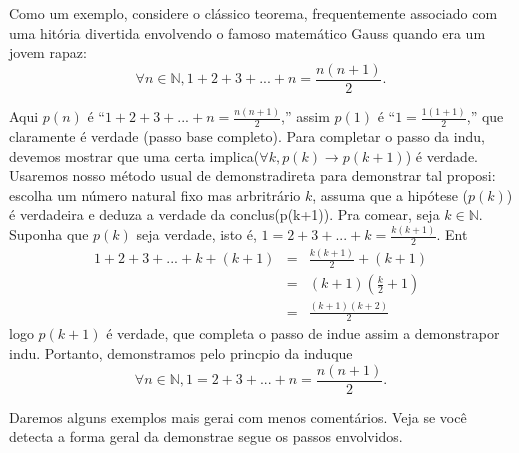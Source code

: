 Como um exemplo, considere o cl\'assico teorema, frequentemente associado com uma hit\'oria divertida envolvendo o famoso matem\'atico Gauss quando era um jovem rapaz:
\[
\forall n\in\mathbb{N}, 1+2+3+...+n=\frac{n(n+1)}{2}.
\]

Aqui $p(n)$ \'e ``$1+2+3+...+n=\frac{n(n+1)}{2}$,'' assim $p(1)$ \'e ``$1=\frac{1(1+1)}{2}$,'' que claramente \'e verdade (passo base completo). Para completar o passo da indu\caoi, devemos mostrar que uma certa implica\cao ($\forall k, p(k)\rightarrow p(k+1)$) \'e verdade. Usaremos nosso m\'etodo usual de demonstra\cao direta para demonstrar tal proposi\caoi: escolha um n\'umero natural fixo mas arbritr\'ario $k$, assuma que a hip\'otese ($p(k)$) \'e verdadeira e deduza a verdade da conclus\ao (p(k+1)). Pra come\cc ar, seja $k\in\mathbb{N}$. Suponha que $p(k)$ seja verdade, isto \'e, $1=2+3+...+k=\frac{k(k+1)}{2}$. Ent\ao
\begin{eqnarray*}
1+2+3+...+k+(k+1)&=& \frac{k(k+1)}{2}+(k+1)\\
                 &=& (k+1)\left(\frac{k}{2}+1\right)\\
                 &=& \frac{(k+1)(k+2)}{2}
\end{eqnarray*}  
logo $p(k+1)$ \'e verdade, que completa o passo de indu\cao e assim a demonstra\cao por indu\caoi. Portanto, demonstramos pelo princ\ih pio da indu\cao que 
\[
\forall n\in\mathbb{N}, 1=2+3+...+n=\frac{n(n+1)}{2}.
\] 

Daremos alguns exemplos mais gerai com menos coment\'arios. Veja se voc\^e detecta a forma geral da demonstra\cao e segue os passos envolvidos.

